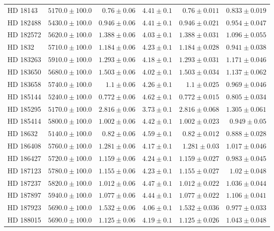 \begin{longtable*}{lrrrrr}
HD 18143 & $5170.0\pm 100.0$ & $0.76\pm 0.06$ & $4.41\pm 0.1$ & $0.76\pm 0.011$ & $0.833\pm 0.019$ \\ 
HD 182488 & $5430.0\pm 100.0$ & $0.946\pm 0.06$ & $4.41\pm 0.1$ & $0.946\pm 0.021$ & $0.954\pm 0.047$ \\ 
HD 182572 & $5620.0\pm 100.0$ & $1.388\pm 0.06$ & $4.03\pm 0.1$ & $1.388\pm 0.031$ & $1.096\pm 0.055$ \\ 
HD 1832 & $5710.0\pm 100.0$ & $1.184\pm 0.06$ & $4.23\pm 0.1$ & $1.184\pm 0.028$ & $0.941\pm 0.038$ \\ 
HD 183263 & $5910.0\pm 100.0$ & $1.293\pm 0.06$ & $4.18\pm 0.1$ & $1.293\pm 0.031$ & $1.171\pm 0.046$ \\ 
HD 183650 & $5680.0\pm 100.0$ & $1.503\pm 0.06$ & $4.02\pm 0.1$ & $1.503\pm 0.034$ & $1.137\pm 0.062$ \\ 
HD 183658 & $5740.0\pm 100.0$ & $1.1\pm 0.06$ & $4.26\pm 0.1$ & $1.1\pm 0.025$ & $0.969\pm 0.046$ \\ 
HD 185144 & $5240.0\pm 100.0$ & $0.772\pm 0.06$ & $4.62\pm 0.1$ & $0.772\pm 0.015$ & $0.805\pm 0.034$ \\ 
HD 185295 & $5170.0\pm 100.0$ & $2.816\pm 0.06$ & $3.73\pm 0.1$ & $2.816\pm 0.068$ & $1.305\pm 0.061$ \\ 
HD 185414 & $5800.0\pm 100.0$ & $1.002\pm 0.06$ & $4.42\pm 0.1$ & $1.002\pm 0.023$ & $0.949\pm 0.05$ \\ 
HD 18632 & $5140.0\pm 100.0$ & $0.82\pm 0.06$ & $4.59\pm 0.1$ & $0.82\pm 0.012$ & $0.888\pm 0.028$ \\ 
HD 186408 & $5760.0\pm 100.0$ & $1.281\pm 0.06$ & $4.17\pm 0.1$ & $1.281\pm 0.03$ & $1.017\pm 0.046$ \\ 
HD 186427 & $5720.0\pm 100.0$ & $1.159\pm 0.06$ & $4.24\pm 0.1$ & $1.159\pm 0.027$ & $0.983\pm 0.045$ \\ 
HD 187123 & $5780.0\pm 100.0$ & $1.155\pm 0.06$ & $4.23\pm 0.1$ & $1.155\pm 0.027$ & $1.02\pm 0.048$ \\ 
HD 187237 & $5820.0\pm 100.0$ & $1.012\pm 0.06$ & $4.47\pm 0.1$ & $1.012\pm 0.022$ & $1.036\pm 0.044$ \\ 
HD 187897 & $5940.0\pm 100.0$ & $1.077\pm 0.06$ & $4.44\pm 0.1$ & $1.077\pm 0.022$ & $1.106\pm 0.041$ \\ 
HD 187923 & $5690.0\pm 100.0$ & $1.532\pm 0.06$ & $4.06\pm 0.1$ & $1.532\pm 0.036$ & $0.977\pm 0.033$ \\ 
HD 188015 & $5690.0\pm 100.0$ & $1.125\pm 0.06$ & $4.19\pm 0.1$ & $1.125\pm 0.026$ & $1.043\pm 0.048$ \\ 

\end{longtable*}

